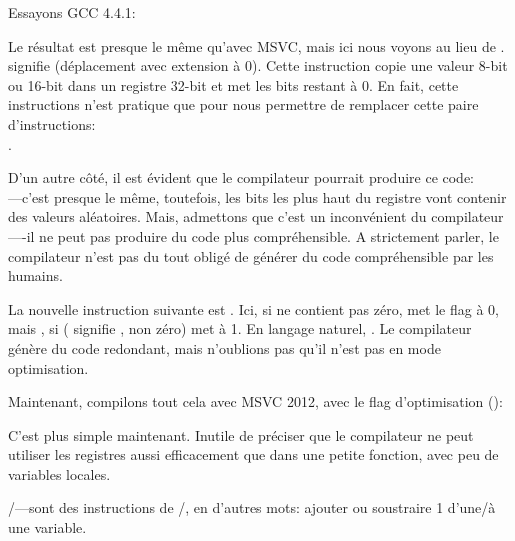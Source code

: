 Essayons GCC 4.4.1:



\label{movzx}

Le résultat est presque le même qu'avec MSVC, mais ici nous voyons \MOVZX au lieu
de \MOVSX.
\MOVZX signifie  (déplacement avec extension à 0).
Cette instruction copie une valeur 8-bit ou 16-bit dans un registre 32-bit et met
les bits restant à 0.
En fait, cette instructions n'est pratique que pour nous permettre de remplacer cette
paire d'instructions:\\
.

D'un autre côté, il est évident que le compilateur pourrait produire ce code: \\
---c'est presque le même, toutefois, les
bits les plus haut du registre \EAX vont contenir des valeurs aléatoires.
Mais, admettons que c'est un inconvénient du compilateur----il ne peut pas produire
du code plus compréhensible. A strictement parler, le compilateur n'est pas du tout
obligé de générer du code compréhensible par les humains.


La nouvelle instruction suivante est \SETNZ.
Ici, si \AL ne contient pas zéro,  met le flag \ZF à 0, mais \SETNZ,
si  ( signifie , non zéro) met \AL à 1. En langage
naturel, . Le compilateur génère
du code redondant, mais n'oublions pas qu'il n'est pas en mode optimisation.

\label{strlen_MSVC_Ox}

Maintenant, compilons tout cela avec MSVC 2012, avec le flag d'optimisation (\Ox):



C'est plus simple maintenant. Inutile de préciser que le compilateur ne peut utiliser
les registres aussi efficacement que dans une petite fonction, avec peu de variables
locales.

\INC/\DEC---sont des instructions de /,
en d'autres mots: ajouter ou soustraire 1 d'une/à une variable.


